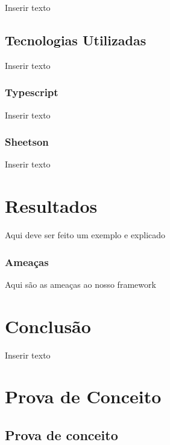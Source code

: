 \documentclass[12pt]{tcc}
\begin{document}
Inserir texto


\section{Tecnologias Utilizadas}

Inserir texto

\subsection{Typescript}

Inserir texto

\subsection{Sheetson}

Inserir texto



\chapter{Resultados}
\label{cap:resultados}

Aqui deve ser feito um exemplo e explicado

\subsection{Ameaças}
Aqui são as ameaças ao nosso framework
	

\chapter{Conclusão}
\label{cap:conclusão}

Inserir texto

\label{bibpage}
\renewcommand\bibname{Referências}

%

\label{bibfinalpage}

\label{lastpage}



\appendix
\chapter{Prova de Conceito}
\label{apx:mock}

\section{Prova de conceito}
\label{cap:prova_de_conceito}
\end{document}

